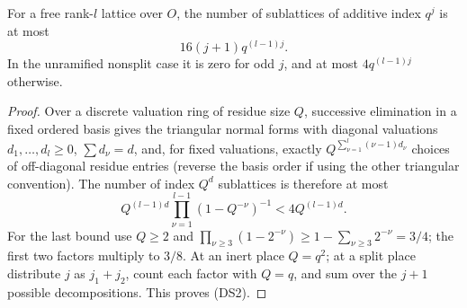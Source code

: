 \begin{lemma}
\label{lem:flag-defect-sublattices}
For a free rank-\(l\) lattice over \(O\), the number of
sublattices of additive index \(q^j\) is at most
\[
             16(j+1)q^{(l-1)j}. \tag{DS2}
\]
In the unramified nonsplit case it is zero for odd \(j\),
and at most \(4q^{(l-1)j}\) otherwise.
\end{lemma}
\begin{proof}
Over a discrete valuation ring of residue size \(Q\),
successive elimination in a fixed ordered basis gives
the triangular normal forms with diagonal valuations
\(d_1,\dots,d_l\ge0\), \(\sum d_\nu=d\), and, for fixed
valuations, exactly \(Q^{\sum_{\nu=1}^l(\nu-1)d_\nu}\)
choices of off-diagonal residue entries (reverse the
basis order if using the other triangular convention).
The number of index \(Q^d\) sublattices is therefore
at most
\[
 Q^{(l-1)d}\prod_{\nu=1}^{l-1}(1-Q^{-\nu})^{-1}
       <4Q^{(l-1)d}.
\]
For the last bound use \(Q\ge2\) and
\(\prod_{\nu\ge3}(1-2^{-\nu})\ge
1-\sum_{\nu\ge3}2^{-\nu}=3/4\);
the first two factors multiply to \(3/8\).
At an inert place \(Q=q^2\); at a split place distribute
\(j\) as \(j_1+j_2\), count each factor with \(Q=q\),
and sum over the \(j+1\) possible decompositions.
This proves (DS2).
\end{proof}

